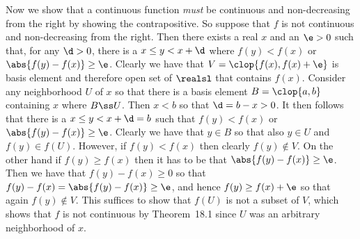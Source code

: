 {{    Now we show that a continuous function \emph{must} be continuous and non-decreasing from the right by showing the contrapositive.
    So suppose that $f$ is not continuous and non-decreasing from the right.
    Then there exists a real $x$ and an $\e > 0$ such that, for any $\d > 0$, there is a $x \leq y <x+\d$ where $f(y) < f(x)$ or $\abs{f(y)-f(x)} \geq \e$.
    Clearly we have that $V = \clop{f(x), f(x)+\e}$ is basis element and therefore open set of $\realsl$ that contains $f(x)$.
    Consider any neighborhood $U$ of $x$ so that there is a basis element $B = \clop{a,b}$ containing $x$ where $B \ss U$.
    Then $x < b$ so that $\d = b - x > 0$.
    It then follows that there is a $x \leq y < x+\d = b$ such that $f(y) < f(x)$ or $\abs{f(y) - f(x)} \geq \e$.
    Clearly we have that $y \in B$ so that also $y \in U$ and $f(y) \in f(U)$.
    However, if $f(y) < f(x)$ then clearly $f(y) \notin V$.
    On the other hand if $f(y) \geq f(x)$ then it has to be that $\abs{f(y) - f(x)} \geq \e$.
    Then we have that $f(y) - f(x) \geq 0$ so that $f(y) - f(x) = \abs{f(y) - f(x)} \geq \e$, and hence $f(y) \geq f(x) + \e$ so that again $f(y) \notin V$.
    This suffices to show that $f(U)$ is not a subset of $V$, which shows that $f$ is not continuous by Theorem~18.1 since $U$ was an arbitrary neighborhood of $x$.
  }
}

